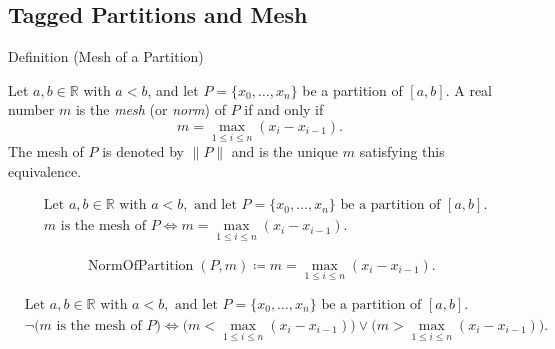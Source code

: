 

\subsection*{Tagged Partitions and Mesh}
\label{sec:tagged-partitions}


\begin{definitionbox}{Definition (Mesh of a Partition)}
\begin{definition}
\label{def:mesh-of-partition}
Let $a,b \in \mathbb{R}$ with $a<b$, and let $P=\{x_0,\ldots,x_n\}$ be a partition of $[a,b]$. A real number $m$ is the \emph{mesh} (or \emph{norm}) of $P$ if and only if
\[
m=\max_{1\le i\le n}(x_i - x_{i-1}).
\]
The mesh of $P$ is denoted by $\|P\|$ and is the unique $m$ satisfying this equivalence.
\end{definition}
\end{definitionbox}

\begin{remark*}
\[
\begin{aligned}
&\text{Let } a,b\in\mathbb{R} \text{ with } a<b, \text{ and let } P=\{x_0,\ldots,x_n\} \text{ be a partition of } [a,b].\\
&m \text{ is the mesh of } P
\Longleftrightarrow
m=\max_{1\le i\le n}(x_i - x_{i-1}).
\end{aligned}
\]
\end{remark*}

\begin{remark*}
\[
\operatorname{NormOfPartition}(P,m) \coloneqq m=\max_{1\le i\le n}(x_i - x_{i-1}).
\]
\end{remark*}

\begin{remark*}
\[
\begin{aligned}
&\text{Let } a,b\in\mathbb{R} \text{ with } a<b, \text{ and let } P=\{x_0,\ldots,x_n\} \text{ be a partition of } [a,b].\\
&\neg\bigl(m \text{ is the mesh of } P\bigr)
\Longleftrightarrow
\bigl(m<\max_{1\le i\le n}(x_i - x_{i-1})\bigr)\lor\bigl(m>\max_{1\le i\le n}(x_i - x_{i-1})\bigr).
\end{aligned}
\]
\end{remark*}

